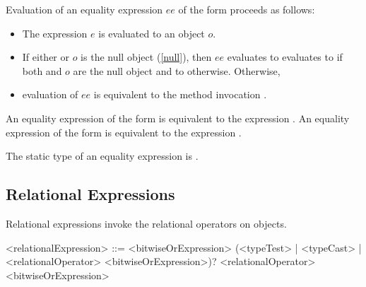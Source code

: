 \documentclass[makeidx]{article}
\begin{document}
{\LMHash{}%
Evaluation of an equality expression $ee$ of the form
proceeds as follows:

\begin{itemize}
\item The expression $e$ is evaluated to an object $o$.
\item If either \THIS{} or $o$ is the null object (\ref{null}),
  then $ee$ evaluates to evaluates to \TRUE{}
  if both \THIS{} and $o$ are the null object
  and to \FALSE{} otherwise.
Otherwise,
\item evaluation of $ee$ is equivalent to the method invocation
  .
\end{itemize}


\LMHash{}%
An equality expression of the form  is equivalent to
the expression .
An equality expression of the form  is equivalent to
the expression .


\LMHash{}%
The static type of an equality expression is .


\subsection{Relational Expressions}

\LMHash{}%
Relational expressions invoke the relational operators on objects.

\begin{grammar}
<relationalExpression> ::= <bitwiseOrExpression> \gnewline{}
  (<typeTest> | <typeCast> | <relationalOperator> <bitwiseOrExpression>)?
  \alt \SUPER{} <relationalOperator> <bitwiseOrExpression>


\end{grammar}}
\end{document}
